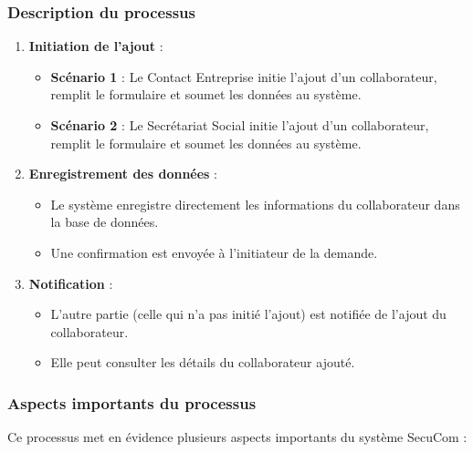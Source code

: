 \vspace{0.5cm}

\subsubsection{Description du processus}

\begin{enumerate}
  \item \textbf{Initiation de l'ajout} :
    \begin{itemize}
      \item \textbf{Scénario 1} : Le Contact Entreprise initie l'ajout d'un collaborateur, remplit le formulaire et soumet les données au système.
      \item \textbf{Scénario 2} : Le Secrétariat Social initie l'ajout d'un collaborateur, remplit le formulaire et soumet les données au système.
    \end{itemize}

  \item \textbf{Enregistrement des données} :
    \begin{itemize}
      \item Le système enregistre directement les informations du collaborateur dans la base de données.
      \item Une confirmation est envoyée à l'initiateur de la demande.
    \end{itemize}

  \item \textbf{Notification} :
    \begin{itemize}
      \item L'autre partie (celle qui n'a pas initié l'ajout) est notifiée de l'ajout du collaborateur.
      \item Elle peut consulter les détails du collaborateur ajouté.
    \end{itemize}
\end{enumerate}

\subsubsection{Aspects importants du processus}

Ce processus met en évidence plusieurs aspects importants du système SecuCom :

